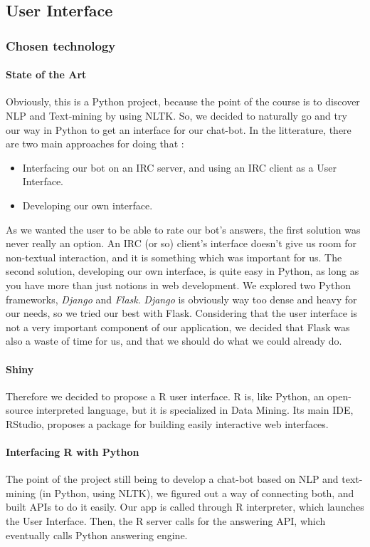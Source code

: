 \subsection{User Interface}
\subsubsection{Chosen technology}
\label{subs:Technology}

\paragraph{State of the Art}
\label{par:SotA}
Obviously, this is a Python project, because the point of the course is to discover NLP and Text-mining by using NLTK.
So, we decided to naturally go and try our way in Python to get an interface for our chat-bot.
In the litterature, there are two main approaches for doing that :
\begin{itemize}
    \item Interfacing our bot on an IRC server, and using an IRC client as a User Interface.
    \item Developing our own interface.
\end{itemize}
As we wanted the user to be able to rate our bot's answers, the first solution was never really an option.
An IRC (or so) client's interface doesn't give us room for non-textual interaction, and it is something which was important for us.
The second solution, developing our own interface, is quite easy in Python, as long as you have more than just notions in web development.
We explored two Python frameworks, \textit{Django} and \textit{Flask}.
\textit{Django} is obviously way too dense and heavy for our needs, so we tried our best with Flask.
Considering that the user interface is not a very important component of our application, we decided that Flask was also a waste of time for us, and that we should do what we could already do.

\paragraph{Shiny}
\label{par:Shiny}
Therefore we decided to propose a R user interface.
R is, like Python, an open-source interpreted language, but it is specialized in Data Mining.
Its main IDE, RStudio, proposes a package for building easily interactive web interfaces.

\paragraph{Interfacing R with Python}
\label{par:rPython}
The point of the project still being to develop a chat-bot based on NLP and text-mining (in Python, using NLTK), we figured out a way of connecting both, and built APIs to do it easily.
Our app is called through R interpreter, which launches the User Interface. Then, the R server calls for the answering API, which eventually calls Python answering engine.

